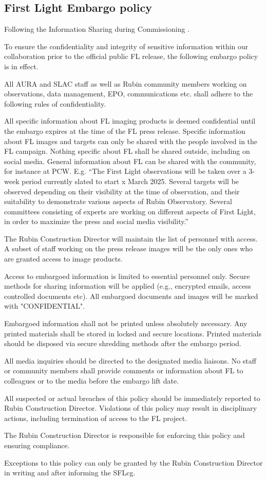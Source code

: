 \subsection{First Light Embargo policy}
Following the Information Sharing during Commissioning \cite{sitcomtn-076}.

To ensure the confidentiality and integrity of sensitive information within our collaboration prior to the official public FL release, the following embargo policy is in effect.

All AURA and SLAC staff as well as Rubin community members working on observations, data management, EPO, communications etc. shall adhere to the following rules of confidentiality.

All specific information about FL imaging products is deemed confidential until the embargo expires at the time of the FL press release. Specific information about FL images and targets can only be shared with the people involved in the FL campaign. Nothing specific about FL shall be shared outside, including on social media. General information about FL can be shared with the community, for instance at PCW. E.g. “The First Light observations will be taken over a 3-week period currently slated to start x March 2025. Several targets will be observed depending on their visibility at the time of observation, and their suitability to demonstrate various aspects of Rubin Observatory. Several committees consisting of experts are working on different aspects of First Light, in order to maximize the press and social media visibility.”

The Rubin Construction Director will maintain the list of personnel with access. A subset of staff working on the press release images will be the only ones who are granted access to image products.

Access to embargoed information is limited to essential personnel only. Secure methods for sharing information will be applied (e.g., encrypted emails, access controlled documents etc). All embargoed documents and images will be marked with "CONFIDENTIAL".

Embargoed information shall not be printed unless absolutely necessary. Any printed materials shall be stored in locked and secure locations. Printed materials should be disposed via secure shredding methods after the embargo period.

All media inquiries should be directed to the designated media liaisons. No staff or community members shall provide comments or information about FL to colleagues or to the media before the embargo lift date.

All suspected or actual breaches of this policy should be immediately reported to Rubin Construction Director. Violations of this policy may result in disciplinary actions, including termination of access to the FL project.

The Rubin Construction Director is responsible for enforcing this policy and ensuring compliance.

Exceptions to this policy can only be granted by the Rubin Construction Director in writing and after informing the SFLcg.
